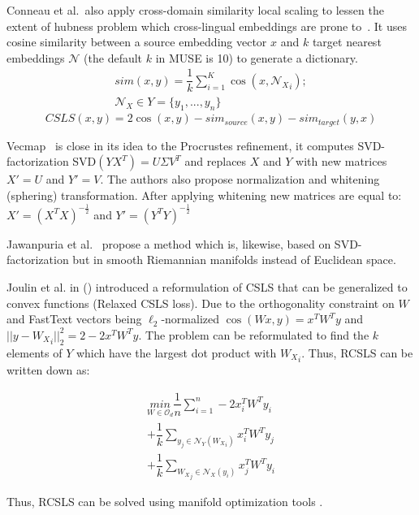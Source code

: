 \documentclass[conference]{IEEEtran}
\begin{document}
	Conneau et al.\ also apply cross-domain similarity local scaling to lessen the extent of hubness problem which cross-lingual embeddings are prone to~\cite{dinu}. It uses cosine similarity between a source embedding vector $x$ and $k$ target nearest embeddings $\mathcal{N}$ (the default $k$ in MUSE is 10) to generate a dictionary.
	\begin{align*}
		sim(x, y) = \dfrac{1}{k}\sum_{i=1}^K\cos(x, {\mathcal{N}_X}_i);\\
		\mathcal{N}_X \in Y=\{y_1,...,y_n\} 
	\end{align*}
	\small
	$$CSLS(x,y) = 2\cos(x,y) - sim_{source}(x, y)  - sim_{target}(y, x)$$
	\normalsize
	
	Vecmap~\cite{vecmap} is close in its idea to the Procrustes refinement, it computes SVD-factorization SVD$(YX^T) = U\Sigma V^T$ and replaces $X$ and $Y$ with new matrices $X' = U$ and $Y' = V$. The authors also propose normalization and whitening (sphering) transformation. After applying whitening new matrices are equal to:
	$X' = {({X^T}X)}^{-\tfrac{1}{2}}$ and $Y' = {({Y^T}Y)}^{-\tfrac{1}{2}}$
	
	Jawanpuria et al.~\cite{jawanpuria} propose a method which is, likewise, based on SVD-factorization but in smooth Riemannian manifolds instead of Euclidean space.
	
	Joulin et al. in (\citeyear{joulin2018loss}) introduced a reformulation of CSLS that can be generalized to convex functions (Relaxed CSLS loss). Due to the orthogonality constraint on $W$ and FastText vectors being $\ell_2$-normalized $\cos(Wx, y) = x^T W^Ty$ and $|| y - {W_X}_i ||^2_2 = 2 - 2x^TW^Ty$. The problem can be reformulated to find the $k$ elements of $Y$ which have the largest dot product with ${W_X}_i$. Thus, RCSLS can be written down as:
	
	\begin{align*}
		\underset{W \in  \mathcal O_d}{min} \dfrac{1}{n}\sum_{i=1}^{n} - 2x^T_iW^Ty_i \\
		+ \dfrac{1}{k} \sum_{y_j \in \mathcal{N}_Y({W_X}_i)}^{ } x_i^T W^Ty_j \\
		+ \dfrac{1}{k} \sum_{{W_X}_j \in \mathcal{N}_X(y_i)}^{ } x_j^T W^Ty_i
	\end{align*}
	
	Thus, RCSLS can be solved using manifold optimization tools \cite{boumal2014manopt}.
\end{document}
